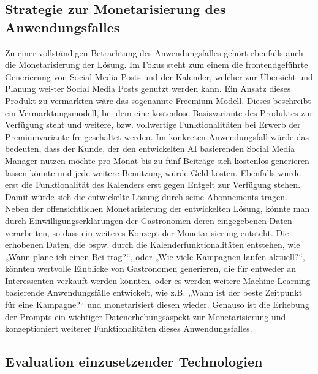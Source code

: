 \subsection{Strategie zur Monetarisierung des Anwendungsfalles}
Zu einer vollständigen Betrachtung des Anwendungsfalles gehört ebenfalls auch die Monetarisierung der Lösung.
Im Fokus steht zum einem die frontendgeführte Generierung von Social Media Posts und der Kalender, welcher zur Übersicht und Planung wei-ter Social Media Posts genutzt werden kann.
Ein Ansatz dieses Produkt zu vermarkten wäre das sogenannte Freemium-Modell.
Dieses beschreibt ein Vermarktungsmodell, bei dem eine kostenlose Basisvariante des Produktes zur Verfügung steht und weitere, bzw. vollwertige Funktionalitäten bei Erwerb der Premiumvariante freigeschaltet werden.
Im konkreten Anwendungsfall würde das bedeuten, dass der Kunde, der den entwickelten AI basierenden Social Media Manager nutzen möchte pro Monat bis zu fünf Beiträge sich kostenlos generieren lassen könnte und jede weitere Benutzung würde Geld kosten.
Ebenfalls würde erst die Funktionalität des Kalenders erst gegen Entgelt zur Verfügung stehen.
Damit würde sich die entwickelte Lösung durch seine Abonnements tragen.
Neben der offensichtlichen Monetarisierung der entwickelten Lösung, könnte man durch Einwilligungserklärungen der Gastronomen deren eingegebenen Daten verarbeiten, so-dass ein weiteres Konzept der Monetarisierung entsteht.
Die erhobenen Daten, die bspw. durch die Kalenderfunktionalitäten entstehen, wie „Wann plane ich einen Bei-trag?“, oder „Wie viele Kampagnen laufen aktuell?“, könnten wertvolle Einblicke von Gastronomen generieren, die für entweder an Interessenten verkauft werden könnten, oder es werden weitere Machine Learning-basierende Anwendungsfälle entwickelt, wie z.B. „Wann ist der beste Zeitpunkt für eine Kampagne?“ und monetarisiert diesen wieder.
Genauso ist die Erhebung der Prompts ein wichtiger Datenerhebungsaspekt zur Monetarisierung und konzeptioniert weiterer Funktionalitäten dieses Anwendungsfalles.

\subsection{Evaluation einzusetzender Technologien}

